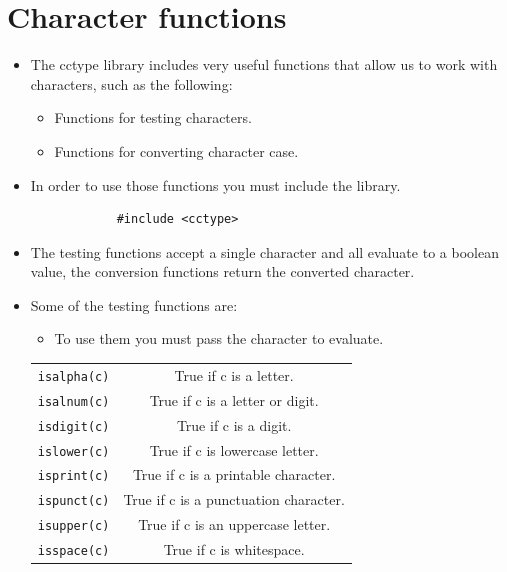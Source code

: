 \section{Character functions}
\begin{itemize}
    \item The cctype library includes very useful functions that allow us to work with characters, such as the following:
        \begin{itemize}
            \item Functions for testing characters.
            \item Functions for converting character case.
        \end{itemize}
    \item In order to use those functions you must include the library.
        \begin{verbatim}
            #include <cctype>
        \end{verbatim}
    
    \item The testing functions accept a single character and all evaluate to a boolean value, the conversion functions return the converted character.
    \item Some of the testing functions are:
        \begin{itemize}
            \item To use them you must pass the character to evaluate.
        \end{itemize}
        \begin{center}
            \begin{tabular}{ |c|c| }
                \hline 
                    \texttt{isalpha(c)} & True if c is a letter. \\
                    \texttt{isalnum(c)} & True if c is a letter or digit. \\
                    \texttt{isdigit(c)} & True if c is a digit. \\
                    \texttt{islower(c)} & True if c is lowercase letter. \\
                    \texttt{isprint(c)} & True if c is a printable character. \\
                    \texttt{ispunct(c)} & True if c is a punctuation character. \\
                    \texttt{isupper(c)} & True if c is an uppercase letter. \\
                    \texttt{isspace(c)} & True if c is whitespace. \\
                \hline
            \end{tabular}
        \end{center}
    

\end{itemize}
